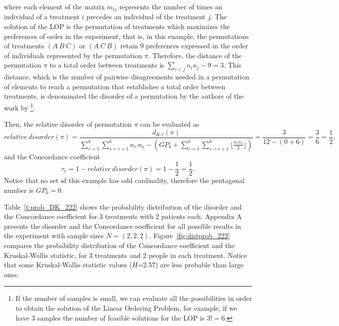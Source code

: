 where each element of the matrix $m_{ij}$ represents the number of times an individual of a treatment $i$ precedes an individual of the treatment $j$. The solution of the LOP is the permutation of treatments which maximizes the preferences of order in the experiment, that is, in this example, the permutations of treatments $(A\ B\ C)$ or $(A\ C\ B)$ retain 9 preferences expressed in the order of individuals represented by the permutation $\pi$. Therefore, the distance of the permutation $\pi$ to a total order between treatments is $\sum_{i<j} n_i n_j -9 =3$. This distance, which is the number of pairwise disagreements needed in a permutation of elements to reach a permutation that establishes a total order between treatments, is denominated the disorder of a permutation by the authors of the work by \cite{Aparicio2020}\footnote{If the number of samples is small, we can evaluate all the possibilities in order to obtain the solution of the Linear Ordering Problem, for example, if we have 3 samples the number of feasible solutions for the LOP is $3!=6$.}.

Then, the relative  disorder of permutation $\pi$ can be evaluated as 
$$ relative \,disorder(\pi) = \frac{\displaystyle d_{K\text{-}\tau}(\pi)}{\displaystyle\sum_{r=1}^k\sum_{s =r+1}^k  n_r \, n_s   -  (GP_{b} +\sum_{r=1}^k\sum_{s =r+1}^k\displaystyle\lfloor\frac{n_r n_s}{2}\displaystyle\rfloor )} =\frac{\displaystyle 3}{\displaystyle 12  -  (0
+6  )} = \frac{3}{6}=\frac{1}{2},$$
and the Concordance coefficient
$$\tau_c= 1- relative\,disorder(\pi) = 1-\frac{1}{2}=\frac{1}{2}.$$ 
Notice that no set of this example has odd cardinality, therefore the pentagonal number is $GP_0=0$.

Table~\ref{t:prob_DK_222} shows the probability distribution of the disorder and the Concordance coefficient for 3 treatments with 2 patients each. Appendix A presents the disorder and the Concordance coefficient for all possible results in the experiment with sample sizes $N = (2,2,2)$. Figure~\ref{fig:distprob_222} compares the probability distribution of the Concordance coefficient and the Kruskal-Wallis statistic, for 3 treatments and 2 people in each treatment. Notice that some Kruskal-Wallis statistic values ($H$=2.57) are less probable than large ones. 


